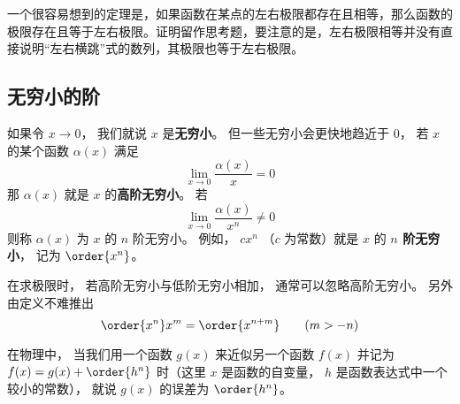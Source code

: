 一个很容易想到的定理是，如果函数在某点的左右极限都存在且相等，那么函数的极限存在且等于左右极限。证明留作思考题，要注意的是，左右极限相等并没有直接说明“左右横跳”式的数列，其极限也等于左右极限。





\subsection{无穷小的阶}\label{sub_Lim_1}
如果令 $x\to 0$， 我们就说 $x$ 是\textbf{无穷小}。 但一些无穷小会更快地趋近于 $0$， 若 $x$ 的某个函数 $\alpha(x)$ 满足
\begin{equation}
\lim_{x\to 0} \frac{\alpha(x)}{x} = 0
\end{equation}
那 $\alpha(x)$ 就是 $x$ 的\textbf{高阶无穷小}。 若
\begin{equation}
\lim_{x\to 0} \frac{\alpha(x)}{x^n} \ne 0
\end{equation}
则称 $\alpha(x)$ 为 $x$ 的 $n$ 阶无穷小。 例如， $c x^n$ （$c$ 为常数）就是 $x$ 的 \textbf{$n$ 阶无穷小}， 记为 $\order{x^n}$。

在求极限时， 若高阶无穷小与低阶无穷小相加， 通常可以忽略高阶无穷小。 另外由定义不难推出
\begin{equation}
\order{x^n} x^m = \order{x^{n + m}} \qquad (m > -n)
\end{equation}

在物理中， 当我们用一个函数 $g(x)$ 来近似另一个函数 $f(x)$ 并记为 $f(x) = g(x) + \order{h^n}$ 时（这里 $x$ 是函数的自变量， $h$ 是函数表达式中一个较小的常数）， 就说 $g(x)$ 的误差为 $\order{h^n}$。
